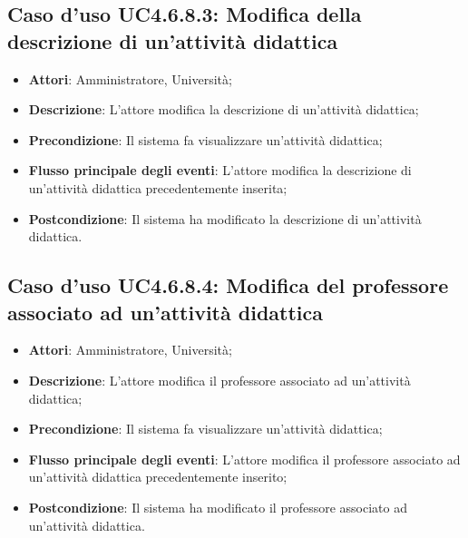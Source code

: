 \subsection{Caso d'uso \texorpdfstring{UC4.6.8.3}{UC4.6.8.3}: Modifica della descrizione di un'attività didattica}
\begin{itemize}
	\item \textbf{Attori}: Amministratore, Università;
	\item \textbf{Descrizione}: L'attore modifica la descrizione di un'attività didattica;
	
	\item \textbf{Precondizione}: Il sistema fa visualizzare un'attività didattica;
	
	
	\item \textbf{Flusso principale degli eventi}: L'attore modifica la descrizione di un'attività didattica precedentemente inserita;
	
	\item \textbf{Postcondizione}: Il sistema ha modificato la descrizione di un'attività didattica.
	
\end{itemize}
\subsection{Caso d'uso \texorpdfstring{UC4.6.8.4}{UC4.6.8.4}: Modifica del professore associato ad un'attività didattica}
\begin{itemize}
	\item \textbf{Attori}: Amministratore, Università;
	\item \textbf{Descrizione}: L'attore modifica il professore associato ad un'attività didattica;
	
	\item \textbf{Precondizione}: Il sistema fa visualizzare un'attività didattica;
	
	
	\item \textbf{Flusso principale degli eventi}: L'attore modifica il professore associato ad un'attività didattica precedentemente inserito;
	
	\item \textbf{Postcondizione}: Il sistema ha modificato il professore associato ad un'attività didattica.
	
\end{itemize}

